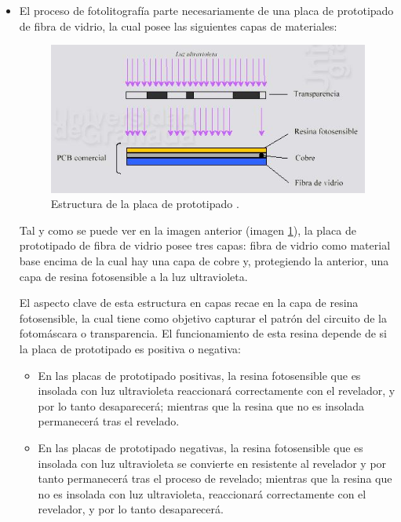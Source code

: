 \begin{itemize}
    \item El proceso de fotolitografía parte necesariamente de una placa de prototipado de fibra de vidrio, la cual posee las siguientes capas de materiales:
    
    \begin{figure}[H]
    \centering 
    \includegraphics[width=0.9\linewidth]{pictures/Proceso1.JPG}
    \caption{Estructura de la placa de prototipado \cite{noauthor_construccion_nodate}.}
    \label{fig:Fotolitografia}
    \end{figure}
    
    Tal y como se puede ver en la imagen anterior (imagen \ref{fig:Fotolitografia}), la placa de prototipado de fibra de vidrio posee tres capas: fibra de vidrio como material base encima de la cual hay una capa de cobre y, protegiendo la anterior, una capa de resina fotosensible a la luz ultravioleta.
    
    El aspecto clave de esta estructura en capas recae en la capa de resina fotosensible, la cual tiene como objetivo capturar el patrón del circuito de la fotomáscara o transparencia. El funcionamiento de esta resina depende de si la placa de prototipado es positiva o negativa:
    \begin{itemize}
        \item En las placas de prototipado positivas, la resina fotosensible que es insolada con luz ultravioleta reaccionará correctamente con el revelador, y por lo tanto desaparecerá; mientras que la resina que no es insolada permanecerá tras el revelado.
        
        \item En las placas de prototipado negativas, la resina fotosensible que es insolada con luz ultravioleta se convierte en resistente al revelador y por tanto permanecerá tras el proceso de revelado; mientras que la resina que no es insolada con luz ultravioleta, reaccionará correctamente con el revelador, y por lo tanto desaparecerá.
    \end{itemize}
    

\end{itemize}
